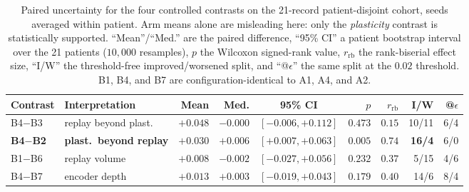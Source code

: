 \begin{table}[H]
\centering
\small
\caption{Paired uncertainty for the four controlled contrasts on the 21-record
patient-disjoint cohort, seeds averaged within patient. Arm means alone are
misleading here: only the \emph{plasticity} contrast is statistically supported.
``Mean''/``Med.'' are the paired difference, ``95\% CI'' a patient bootstrap
interval over the 21 patients ($10{,}000$ resamples), $p$ the Wilcoxon signed-rank value,
$r_{\mathrm{rb}}$ the rank-biserial effect size, ``I/W'' the threshold-free
improved/worsened split, and ``@$\epsilon$'' the same split at the $0.02$
threshold. B1, B4, and B7 are configuration-identical to A1, A4, and A2.}
\label{tab:causal_contrasts}
\setlength{\tabcolsep}{3pt}
\begin{tabular}{llrrcrrrr}
\toprule
Contrast & Interpretation & Mean & Med. & 95\% CI & $p$ & $r_{\mathrm{rb}}$ & I/W & @$\epsilon$ \\
\midrule
B4$-$B3 & replay beyond plast.      & $+0.048$ & $-0.000$ & $[-0.006,+0.112]$ & $0.473$ & $0.15$ & 10/11 & 6/4 \\
\textbf{B4$-$B2} & \textbf{plast.\ beyond replay} & $+0.030$ & $+0.006$ & $\mathbf{[+0.007,+0.063]}$ & $\mathbf{0.005}$ & $\mathbf{0.74}$ & \textbf{16/4} & 6/0 \\
B1$-$B6 & replay volume             & $+0.008$ & $-0.002$ & $[-0.027,+0.056]$ & $0.232$ & $0.37$ & 5/15 & 4/6 \\
B4$-$B7 & encoder depth             & $+0.013$ & $+0.003$ & $[-0.019,+0.043]$ & $0.179$ & $0.40$ & 14/6 & 8/4 \\
\bottomrule
\end{tabular}
\end{table}
